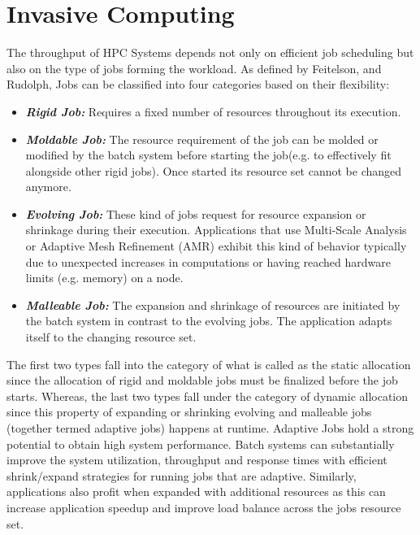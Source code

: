 \section{Invasive Computing}
The throughput of HPC Systems depends not only on efficient job scheduling but also on the type of jobs forming the workload. As defined by Feitelson, and Rudolph, Jobs can be classified into four categories based on their flexibility:
\begin{itemize}
\item \textbf{\textit{Rigid Job:}} Requires a fixed number of resources throughout its execution.
\item \textbf{\textit{Moldable Job: }} The resource requirement of the job can be molded or modified by the batch system before starting the job(e.g. to effectively fit alongside other rigid jobs). Once started its resource set cannot be changed anymore.
\item \textbf{\textit{Evolving Job: }} These kind of jobs request for resource expansion or shrinkage during their execution. Applications that use Multi-Scale Analysis or Adaptive Mesh Refinement (AMR) exhibit this kind of behavior typically due to unexpected increases in computations or having reached hardware limits (e.g. memory) on a node.
\item \textbf{\textit{Malleable Job: }} The expansion and shrinkage of resources are initiated by the batch system in contrast to the evolving jobs. The application adapts itself to the changing resource set.
\end{itemize}
The first two types fall into the category of what is called as the static allocation since the allocation of rigid and moldable jobs must be finalized before the job starts. Whereas, the last two types fall under the category of dynamic allocation since this property of expanding or shrinking evolving and malleable jobs (together termed adaptive jobs) happens at runtime. Adaptive Jobs hold a strong potential to obtain high system performance. Batch systems can substantially improve the system utilization, throughput and response times with efficient shrink/expand strategies for running jobs that are adaptive. Similarly, applications also profit when expanded with additional resources as this can increase application speedup and improve load balance across the job\textquotesingle s resource set.\\ \par
\noindent
